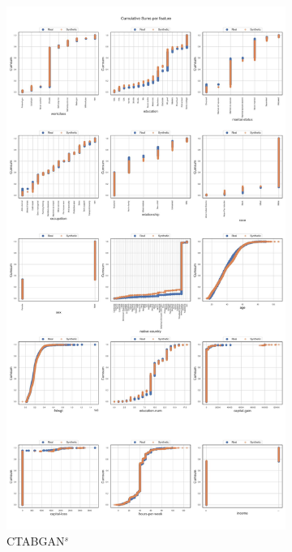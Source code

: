 \begin{landscape}
\begin{figure}[h]
		\hfill
		\begin{subfigure}{0.3\linewidth}
			\includegraphics[height=\textheight,width=\linewidth,keepaspectratio]{images/cumsums/ctabgan_simTune.jpg}
			\caption{CTABGAN$^s$}
		\end{subfigure}	
		\hfill
		\begin{subfigure}{0.3\linewidth}

\end{subfigure}
\end{figure}
\end{landscape}
